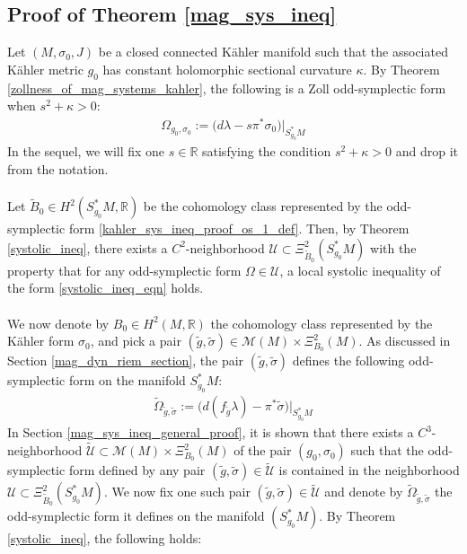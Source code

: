 \documentclass[11pt]{amsart}
\theoremstyle{plain}
\theoremstyle{definition}
\theoremstyle{remark}
\begin{document}
\subsection{Proof of Theorem \ref{mag_sys_ineq}}\label{mag_sys_ineq_proof}
Let $(M,\sigma_0,J)$ be a closed connected K\"ahler manifold such that the associated K\"ahler metric $g_0$ has constant holomorphic sectional curvature $\kappa$. By Theorem \ref{zollness_of_mag_systems_kahler}, the following is a Zoll odd-symplectic form when $s^2+\kappa>0$:
\begin{align}\label{kahler_sys_ineq_proof_os_1_def}
    \Omega_{g_0,\sigma_0}:= \big(d\lambda -s\pi^*\sigma_0\big)\big\vert_{S^*_{g_0}M}
\end{align}
In the sequel, we will fix one $s\in\mathbb{R}$ satisfying the condition $s^2+\kappa>0$ and drop it from the notation.\\
\\
Let $\tilde B_0 \in H^2(S_{g_0}^*M,\mathbb{R})$ be the cohomology class represented by the odd-symplectic form \eqref{kahler_sys_ineq_proof_os_1_def}. Then, by Theorem \ref{systolic_ineq}, there exists a $C^2$-neighborhood $\mathcal{U}\subset \Xi^2_{\tilde B_0}(S_{g_0}^*M)$ with the property that for any odd-symplectic form $\Omega \in \mathcal{U}$, a local systolic inequality of the form \eqref{systolic_ineq_eqn} holds.\\
\\
We now denote by $B_0 \in H^2(M,\mathbb{R})$ the cohomology class represented by the K\"ahler form $\sigma_0$, and pick a pair $(\tilde g,\tilde \sigma) \in \mathcal{M}(M) \times \Xi^2_{B_0}(M)$. As discussed in Section \ref{mag_dyn_riem_section}, the pair $(\tilde g,\tilde \sigma)$ defines the following odd-symplectic form on the manifold $S_{g_0}^*M$:
\begin{align}
    \tilde \Omega_{\tilde g,\tilde \sigma}:= \big(d(f_{\tilde g}\lambda) -\pi^*\tilde \sigma\big)\big\vert_{S^*_{g_0}M}
\end{align}
In Section \ref{mag_sys_ineq_general_proof}, it is shown that there exists a $C^3$-neighborhood $\tilde{\mathcal{U}} \subset \mathcal{M}(M) \times \Xi^2_{B_0}(M)$ of the pair $(g_0,\sigma_0)$ such that the odd-symplectic form defined by any pair $(\tilde g,\tilde \sigma) \in \tilde{\mathcal{U}}$ is contained in the neighborhood $\mathcal{U} \subset \Xi^2_{\tilde B_0}(S^*_{g_0}M)$. We now fix one such pair $(\tilde g,\tilde \sigma) \in \tilde{\mathcal{U}}$ and denote by $ \tilde \Omega_{\tilde g,\tilde \sigma}$ the odd-symplectic form it defines on the manifold $(S_{g_0}^*M)$. By Theorem \ref{systolic_ineq}, the following holds:
\end{document}
